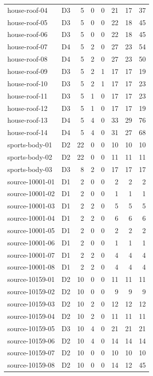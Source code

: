 \begin{longtable}{p{}lrrrrrr}
house-roof-04 & D3 & 5 & 0 & 0 & 21 & 17 & 37\\
house-roof-05 & D3 & 5 & 0 & 0 & 22 & 18 & 45\\
house-roof-06 & D3 & 5 & 0 & 0 & 22 & 18 & 45\\
house-roof-07 & D4 & 5 & 2 & 0 & 27 & 23 & 54\\
house-roof-08 & D4 & 5 & 2 & 0 & 27 & 23 & 50\\
house-roof-09 & D3 & 5 & 2 & 1 & 17 & 17 & 19\\
house-roof-10 & D3 & 5 & 2 & 1 & 17 & 17 & 23\\
house-roof-11 & D3 & 5 & 1 & 0 & 17 & 17 & 23\\
house-roof-12 & D3 & 5 & 1 & 0 & 17 & 17 & 19\\
house-roof-13 & D4 & 5 & 4 & 0 & 33 & 29 & 76\\
house-roof-14 & D4 & 5 & 4 & 0 & 31 & 27 & 68\\
sports-body-01 & D2 & 22 & 0 & 0 & 10 & 10 & 10\\
sports-body-02 & D2 & 22 & 0 & 0 & 11 & 11 & 11\\
sports-body-03 & D3 & 8 & 2 & 0 & 17 & 17 & 17\\
source-10001-01 & D1 & 2 & 0 & 0 & 2 & 2 & 2\\
source-10001-02 & D1 & 2 & 0 & 0 & 1 & 1 & 1\\
source-10001-03 & D1 & 2 & 2 & 0 & 5 & 5 & 5\\
source-10001-04 & D1 & 2 & 2 & 0 & 6 & 6 & 6\\
source-10001-05 & D1 & 2 & 0 & 0 & 2 & 2 & 2\\
source-10001-06 & D1 & 2 & 0 & 0 & 1 & 1 & 1\\
source-10001-07 & D1 & 2 & 2 & 0 & 4 & 4 & 4\\
source-10001-08 & D1 & 2 & 2 & 0 & 4 & 4 & 4\\
source-10159-01 & D2 & 10 & 0 & 0 & 11 & 11 & 11\\
source-10159-02 & D2 & 10 & 0 & 0 & 9 & 9 & 9\\
source-10159-03 & D2 & 10 & 2 & 0 & 12 & 12 & 12\\
source-10159-04 & D2 & 10 & 2 & 0 & 11 & 11 & 11\\
source-10159-05 & D3 & 10 & 4 & 0 & 21 & 21 & 21\\
source-10159-06 & D2 & 10 & 4 & 0 & 14 & 14 & 14\\
source-10159-07 & D2 & 10 & 0 & 0 & 10 & 10 & 10\\
source-10159-08 & D2 & 10 & 0 & 0 & 14 & 12 & 45\\

\end{longtable}
